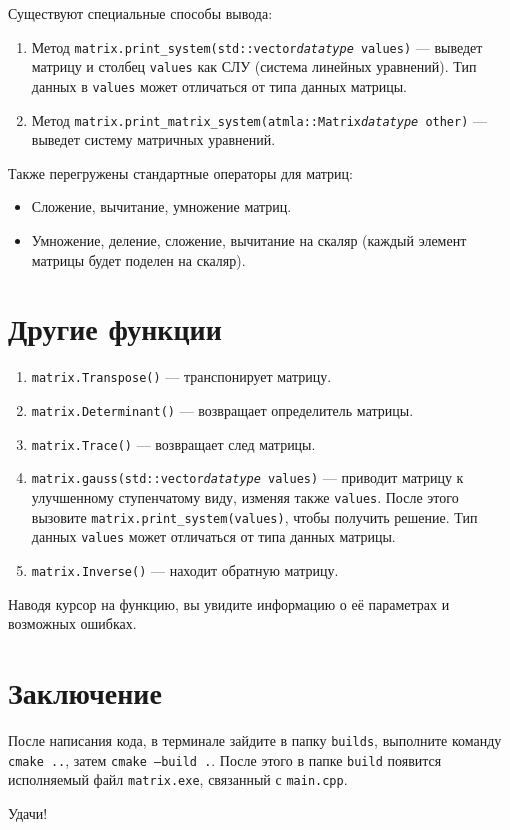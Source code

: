 \documentclass{article}
\begin{document}
Существуют специальные способы вывода:
\begin{enumerate}
    \item Метод \texttt{matrix.print\_system(std::vector{\textit{datatype}} values)} — выведет матрицу и столбец \texttt{values} как СЛУ (система линейных уравнений). Тип данных в \texttt{values} может отличаться от типа данных матрицы.
    \item Метод \texttt{matrix.print\_matrix\_system(atmla::Matrix{\textit{datatype}} other)} — выведет систему матричных уравнений.
\end{enumerate}

Также перегружены стандартные операторы для матриц:
\begin{itemize}
    \item Сложение, вычитание, умножение матриц.
    \item Умножение, деление, сложение, вычитание на скаляр (каждый элемент матрицы будет поделен на скаляр).
\end{itemize}

\section{Другие функции}
\begin{enumerate}
    \item \texttt{matrix.Transpose()} — транспонирует матрицу.
    \item \texttt{matrix.Determinant()} — возвращает определитель матрицы.
    \item \texttt{matrix.Trace()} — возвращает след матрицы.
    \item \texttt{matrix.gauss(std::vector{\textit{datatype}} values)} — приводит матрицу к улучшенному ступенчатому виду, изменяя также \texttt{values}. После этого вызовите \texttt{matrix.print\_system(values)}, чтобы получить решение. Тип данных \texttt{values} может отличаться от типа данных матрицы.
    \item \texttt{matrix.Inverse()} — находит обратную матрицу.
\end{enumerate}

Наводя курсор на функцию, вы увидите информацию о её параметрах и возможных ошибках.

\section{Заключение}
После написания кода, в терминале зайдите в папку \texttt{builds}, выполните команду \texttt{cmake ..}, затем \texttt{cmake --build .}. После этого в папке \texttt{build} появится исполняемый файл \texttt{matrix.exe}, связанный с \texttt{main.cpp}.

Удачи!
\end{document}

